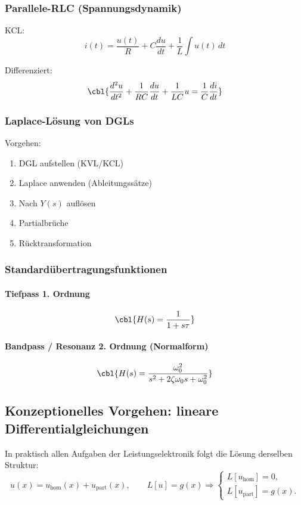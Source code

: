 \subsubsection{Parallele-RLC (Spannungsdynamik)}

KCL:
\[
i(t)=\frac{u(t)}{R}+C\frac{du}{dt}+\frac{1}{L}\int u(t)\,dt
\]

Differenziert:
\[
\cbl{\frac{d^2 u}{dt^2} + \frac{1}{RC}\frac{du}{dt} + \frac{1}{LC}u = \frac{1}{C}\frac{di}{dt}}
\]

\subsubsection{Laplace-Lösung von DGLs}

Vorgehen:
\begin{enumerate}
    \item DGL aufstellen (KVL/KCL)
    \item Laplace anwenden (Ableitungssätze)
    \item Nach $Y(s)$ auflösen
    \item Partialbrüche
    \item Rücktransformation
\end{enumerate}

\subsubsection{Standardübertragungsfunktionen}

\paragraph{Tiefpass 1. Ordnung}
\[
\cbl{H(s)=\frac{1}{1+s\tau}}
\]

\paragraph{Bandpass / Resonanz 2. Ordnung (Normalform)}
\[
\cbl{H(s)=\frac{\omega_0^2}{s^2+2\zeta\omega_0 s+\omega_0^2}}
\]

\subsection{Konzeptionelles Vorgehen: lineare Differentialgleichungen}

In praktisch allen Aufgaben der Leistungselektronik folgt die Lösung derselben Struktur:
\[
u(x) = u_{\mathrm{hom}}(x) + u_{\mathrm{part}}(x),
\qquad
L[u] = g(x)
\Rightarrow
\begin{cases}
L[u_{\mathrm{hom}}] = 0, \\
L[u_{\mathrm{part}}] = g(x).
\end{cases}
\]

